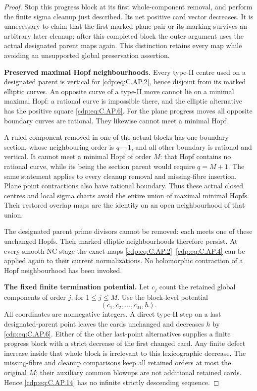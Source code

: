 \begin{proof}
Stop this progress block at its first whole-component
removal, and perform the finite sigma cleanup just described.
Its net positive card vector decreases. It is unnecessary
to claim that the first marked plane pair or its marking
survives an arbitrary later cleanup: after this completed
block the outer argument uses the actual designated parent
maps again. This distinction retains every map while avoiding
an unsupported global preservation assertion.

\par\medskip\noindent\textbf{Preserved maximal Hopf neighbourhoods.}
Every type-II centre used on a designated parent is vertical
for \eqref{cdp:eq:C.AP.2}, hence disjoint from its marked elliptic curves.
An opposite curve of a type-II move cannot lie on a minimal
maximal Hopf: a rational curve is impossible there, and the
elliptic alternative has the positive square \eqref{cdp:eq:C.AP.6}.
For the plane progress moves all opposite boundary curves
are rational. They likewise cannot meet a minimal Hopf.

A ruled component removed in one of the actual blocks has
one boundary section, whose neighbouring order is \(q-1\),
and all other boundary is rational and vertical. It cannot
meet a minimal Hopf of order \(M\): that Hopf contains no
rational curve, while its being the section parent would
require \(q=M+1\). The same statement applies to every
cleanup removal and missing-fibre insertion. Plane point
contractions also have rational boundary. Thus these actual
closed centres and local sigma charts avoid the entire
union of maximal minimal Hopfs. Their restored overlap maps
are the identity on an open neighbourhood of that union.

The designated parent prime divisors cannot be removed:
each meets one of these unchanged Hopfs. Their marked
elliptic neighbourhoods therefore persist. At every smooth
NC stage the exact maps \eqref{cdp:eq:C.AP.2}--\eqref{cdp:eq:C.AP.4} can be applied
again to their current normalizations. No holomorphic
contraction of a Hopf neighbourhood has been invoked.

\par\medskip\noindent\textbf{The fixed finite termination potential.}
Let \(c_j\) count the retained global components of order
\(j\), for \(1\le j\le M\). Use the block-level potential
\[
                  (c_1,c_2,\ldots,c_M,h).
 \tag{C.AP.14}\label{cdp:eq:C.AP.14}
\]
All coordinates are nonnegative integers. A direct type-II
step on a last designated-parent point leaves the cards
unchanged and decreases \(h\) by \eqref{cdp:eq:C.AP.6}. Either of the
other last-point alternatives supplies a finite progress
block with a strict decrease of the first changed card.
Any finite defect increase inside that whole block is
irrelevant to this lexicographic decrease. The missing-fibre
and cleanup comparisons keep all retained orders at most
the original \(M\); their auxiliary common blowups are not
additional retained cards. Hence \eqref{cdp:eq:C.AP.14} has no infinite
strictly descending sequence.


\end{proof}
